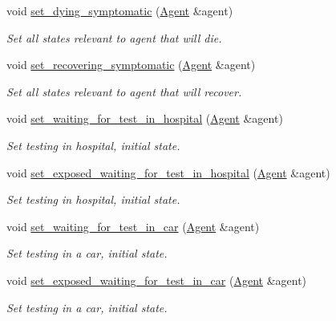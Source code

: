 \begin{DoxyCompactItemize}
void \hyperlink{classRegularStatesManager_a7ebe37dca3740a25fa0682eb471be976}{set\+\_\+dying\+\_\+symptomatic} (\hyperlink{classAgent}{Agent} \&agent)
\begin{DoxyCompactList}\small\item\em Set all states relevant to agent that will die. \end{DoxyCompactList}\item 
void \hyperlink{classRegularStatesManager_a2c1745d45af0aeaf11b5b6718ab8c2d1}{set\+\_\+recovering\+\_\+symptomatic} (\hyperlink{classAgent}{Agent} \&agent)
\begin{DoxyCompactList}\small\item\em Set all states relevant to agent that will recover. \end{DoxyCompactList}\item 
void \hyperlink{classRegularStatesManager_adfe4e02af0388ceb0adba80867079ca7}{set\+\_\+waiting\+\_\+for\+\_\+test\+\_\+in\+\_\+hospital} (\hyperlink{classAgent}{Agent} \&agent)
\begin{DoxyCompactList}\small\item\em Set testing in hospital, initial state. \end{DoxyCompactList}\item 
void \hyperlink{classRegularStatesManager_aac23ea794e2797e61648e3826a9f8eac}{set\+\_\+exposed\+\_\+waiting\+\_\+for\+\_\+test\+\_\+in\+\_\+hospital} (\hyperlink{classAgent}{Agent} \&agent)
\begin{DoxyCompactList}\small\item\em Set testing in hospital, initial state. \end{DoxyCompactList}\item 
void \hyperlink{classRegularStatesManager_abbb119bf6ac68db9594fda91be9b2ee4}{set\+\_\+waiting\+\_\+for\+\_\+test\+\_\+in\+\_\+car} (\hyperlink{classAgent}{Agent} \&agent)
\begin{DoxyCompactList}\small\item\em Set testing in a car, initial state. \end{DoxyCompactList}\item 
void \hyperlink{classRegularStatesManager_a89a7a051bd5b196dc8db2b1343f62f04}{set\+\_\+exposed\+\_\+waiting\+\_\+for\+\_\+test\+\_\+in\+\_\+car} (\hyperlink{classAgent}{Agent} \&agent)
\begin{DoxyCompactList}\small\item\em Set testing in a car, initial state. \end{DoxyCompactList}\item 

\end{DoxyCompactItemize}
